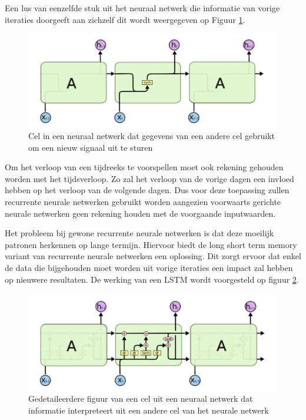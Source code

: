Een lus van eenzelfde stuk uit het neuraal netwerk die informatie van vorige iteraties doorgeeft aan zichzelf dit wordt weergegeven op Figuur \ref{fig:lstmfig1}.

\begin{figure}[!h]
    \centering
    \caption{Cel in een neuraal netwerk dat gegevens van een andere cel gebruikt om een nieuw signaal uit te sturen~\autocite{Olah2015}}
    \label{fig:lstmfig1}
    \includegraphics[width=0.7\linewidth]{lstmFig1}
\end{figure}

Om het verloop van een tijdreeks te voorspellen moet ook rekening gehouden worden met het tijdsverloop. Zo zal het verloop van de vorige dagen een invloed hebben op het verloop van de volgende dagen. Dus voor deze toepassing zullen recurrente neurale netwerken gebruikt worden aangezien voorwaarts gerichte neurale netwerken geen rekening houden met de voorgaande inputwaarden. 

Het probleem bij gewone recurrente neurale netwerken is dat deze moeilijk patronen herkennen op lange termijn. Hiervoor biedt de long short term memory variant van recurrente neurale netwerken een oplossing. Dit zorgt ervoor dat enkel de data die bijgehouden moet worden uit vorige iteraties een impact zal hebben op nieuwere resultaten. De werking van een LSTM wordt voorgesteld op figuur \ref{fig:lstmfig2}.

\begin{figure}[!h]
    \centering
    \caption{Gedetaileerdere figuur van een cel uit een neuraal netwerk dat informatie interpreteert uit een andere cel van het neurale netwerk~\autocite{Olah2015}}
    \label{fig:lstmfig2}
    \includegraphics[width=0.7\linewidth]{lstmFig2}
\end{figure}


